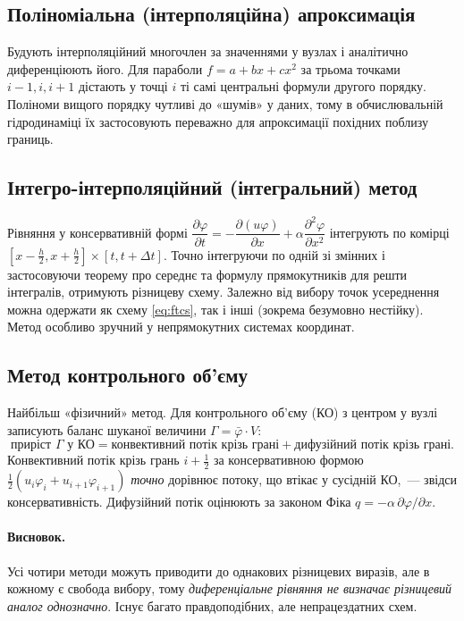 \documentclass[12pt,a4paper]{article}
\theoremstyle{definition}
\theoremstyle{plain}
\newcommand{\dd}[2]{\dfrac{\partial #1}{\partial #2}}
\begin{document}
\subsection{Поліноміальна (інтерполяційна) апроксимація}
Будують інтерполяційний многочлен за значеннями у вузлах і аналітично
диференціюють його. Для параболи $f=a+bx+cx^2$ за трьома точками
$i-1,i,i+1$ дістають у точці $i$ ті самі центральні формули другого
порядку. Поліноми вищого порядку чутливі до «шумів» у даних, тому в
обчислювальній гідродинаміці їх застосовують переважно для апроксимації
похідних поблизу границь.

\subsection{Інтегро-інтерполяційний (інтегральний) метод}
Рівняння у консервативній формі $\dd{\varphi}{t}=-\dd{(u\varphi)}{x}+\alpha\dd{^2\varphi}{x^2}$
інтегрують по комірці $[x-\tfrac h2,x+\tfrac h2]\times[t,t+\Delta t]$.
Точно інтегруючи по одній зі змінних і застосовуючи теорему про середнє
та формулу прямокутників для решти інтегралів, отримують різницеву
схему. Залежно від вибору точок усереднення можна одержати як схему
\eqref{eq:ftcs}, так і інші (зокрема безумовно нестійку). Метод
особливо зручний у непрямокутних системах координат.

\subsection{Метод контрольного об'єму}
Найбільш «фізичний» метод. Для контрольного об'єму (КО) з центром у
вузлі записують баланс шуканої величини $\Gamma=\bar\varphi\cdot V$:
\[
  \text{приріст }\Gamma\text{ у КО}=
  \text{конвективний потік крізь грані}+\text{дифузійний потік крізь грані}.
\]
Конвективний потік крізь грань $i+\tfrac12$ за консервативною формою
$\tfrac12(u_i\varphi_i+u_{i+1}\varphi_{i+1})$ \emph{точно} дорівнює
потоку, що втікає у сусідній КО,~--- звідси консервативність. Дифузійний
потік оцінюють за законом Фіка $q=-\alpha\,\partial\varphi/\partial x$.

\paragraph{Висновок.} Усі чотири методи можуть приводити до однакових
різницевих виразів, але в кожному є свобода вибору, тому
\emph{диференціальне рівняння не визначає різницевий аналог однозначно}.
Існує багато правдоподібних, але непрацездатних схем.
\end{document}
